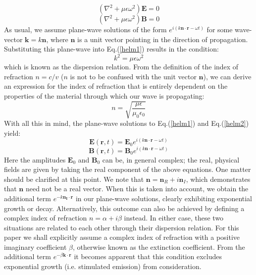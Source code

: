 \documentclass[preprint, onecolumn, amsmath, amssymb, aps]{revtex4-1}
\numberwithin{equation}{section}
\begin{document}
\begin{equation}\label{helm1}
(\nabla^{2} + \mu \epsilon \omega^{2}) \mathbf{E} = 0
\end{equation}
\begin{equation}\label{helm2}
(\nabla^{2} + \mu \epsilon \omega^{2}) \mathbf{B} = 0
\end{equation}
\noindent
As usual, we assume plane-wave solutions of the form $e^{i( k \mathbf{n} \cdot \mathbf{r} - \omega t )}$ for some wave-vector $\mathbf{k} = k \mathbf{n}$, where $\mathbf{n}$ is a unit vector pointing in the direction of propagation. Substituting this plane-wave into Eq.(\ref{helm1}) results in the condition:
\begin{equation}
k^{2} = \mu \epsilon \omega^{2}
\end{equation}
\noindent
which is known as the dispersion relation. From the definition of the index of refraction $n = c / v$ ($n$ is not to be confused with the unit vector $\mathbf{n}$), we can derive an expression for the index of refraction that is entirely dependent on the properties of the material through which our wave is propagating:
\begin{equation}\label{index}
n = \sqrt{ \frac{ \mu \epsilon }{ \mu_{0} \epsilon_{0} } }
\end{equation}
\noindent
With all this in mind, the plane-wave solutions to Eq.(\ref{helm1}) and Eq.(\ref{helm2}) yield:
\begin{equation}
\mathbf{E}(\mathbf{r}, t) = \mathbf{E}_{0} e^{i( k \mathbf{n} \cdot \mathbf{r} - \omega t )}
\end{equation}
\begin{equation}
\mathbf{B}(\mathbf{r}, t) = \mathbf{B}_{0} e^{i( k \mathbf{n} \cdot \mathbf{r} - \omega t )}
\end{equation}
\noindent
Here the amplitudes $\mathbf{E}_{0}$ and $\mathbf{B}_{0}$ can be, in general complex; the real, physical fields are given by taking the real component of the above equations. One matter should be clarified at this point. We note that $\mathbf{n} = \mathbf{n}_{R} + i \mathbf{n}_{I}$, which demonstrates that $\mathbf{n}$ need not be a real vector. When this is taken into account, we obtain the additional term $e^{-k \mathbf{n_{I}} \cdot \mathbf{r}}$ in our plane-wave solutions, clearly exhibiting exponential growth or decay. Alternatively, this outcome can also be achieved by defining a complex index of refraction $n = \alpha + i \beta$ instead. In either case, these two situations are related to each other through their dispersion relation. For this paper we shall explicitly assume a complex index of refraction with a positive imaginary coefficient $\beta$, otherwise known as the extinction coefficient. From the additional term $e^{- \beta \mathbf{k} \cdot \mathbf{r} }$ it becomes apparent that this condition excludes exponential growth (i.e. stimulated emission) from consideration. \\
\end{document}
